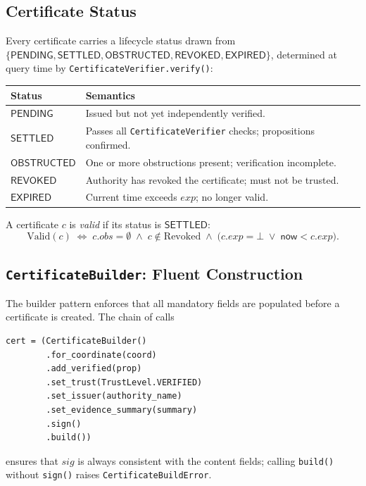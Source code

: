 \documentclass[11pt]{article}
\newcommand{\certsig}{\mathit{sig}}            %
\newcommand{\certobstr}{\mathit{obs}}          %
\newcommand{\certexpiry}{\mathit{exp}}         %
\newcommand{\Valid}{\mathrm{Valid}}            %
\newcommand{\Revoked}{\mathrm{Revoked}}        %
\newcommand{\Pending}{\mathsf{PENDING}}
\newcommand{\Settled}{\mathsf{SETTLED}}
\newcommand{\Obstructed}{\mathsf{OBSTRUCTED}}
\newcommand{\Revk}{\mathsf{REVOKED}}
\newcommand{\Expired}{\mathsf{EXPIRED}}
\newcommand{\StatusSet}{\{\Pending,\Settled,\Obstructed,\Revk,\Expired\}}
\begin{document}
\subsection{Certificate Status}\label{sec:status}

Every certificate carries a lifecycle status drawn from
$\StatusSet$, determined at query time by
\texttt{CertificateVerifier.verify()}:

\begin{center}
\begin{tabular}{lp{9cm}}
\toprule
\textbf{Status} & \textbf{Semantics} \\
\midrule
$\Pending$    & Issued but not yet independently verified. \\
$\Settled$    & Passes all \texttt{CertificateVerifier} checks; propositions confirmed. \\
$\Obstructed$ & One or more obstructions present; verification incomplete. \\
$\Revk$       & Authority has revoked the certificate; must not be trusted. \\
$\Expired$    & Current time exceeds $\certexpiry$; no longer valid. \\
\bottomrule
\end{tabular}
\end{center}

\begin{definition}[Validity]\label{def:valid}
A certificate $c$ is \emph{valid} if its status is $\Settled$:
\[
  \Valid(c) \;\iff\; c.\certobstr = \emptyset \;\wedge\; c \notin \Revoked
             \;\wedge\; \bigl(c.\certexpiry = \bot \;\vee\; \mathsf{now} < c.\certexpiry\bigr).
\]
\end{definition}

\subsection{\texttt{CertificateBuilder}: Fluent Construction}

The builder pattern enforces that all mandatory fields are populated
before a certificate is created.
The chain of calls
\begin{lstlisting}[style=jugeo-python]
cert = (CertificateBuilder()
        .for_coordinate(coord)
        .add_verified(prop)
        .set_trust(TrustLevel.VERIFIED)
        .set_issuer(authority_name)
        .set_evidence_summary(summary)
        .sign()
        .build())
\end{lstlisting}
ensures that $\certsig$ is always consistent with the content fields;
calling \texttt{build()} without \texttt{sign()} raises
\texttt{CertificateBuildError}.
\end{document}
